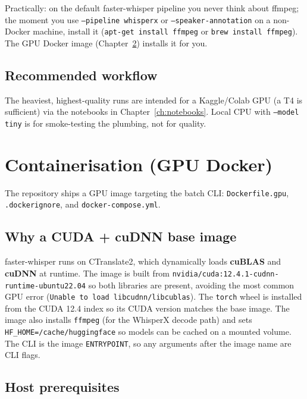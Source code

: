 \documentclass[11pt,a4paper]{report}
\newcommand{\code}[1]{\texttt{\small #1}}
\begin{document}
Practically: on the default faster-whisper pipeline you never think about ffmpeg;
the moment you use \code{--pipeline whisperx} or \code{--speaker-annotation} on a
non-Docker machine, install it (\code{apt-get install ffmpeg} or
\code{brew install ffmpeg}). The GPU Docker image (Chapter~\ref{ch:docker})
installs it for you.

\section{Recommended workflow}

The heaviest, highest-quality runs are intended for a Kaggle/Colab GPU (a T4 is
sufficient) via the notebooks in Chapter~\ref{ch:notebooks}. Local CPU with
\code{--model tiny} is for smoke-testing the plumbing, not for quality.

\chapter{Containerisation (GPU Docker)}
\label{ch:docker}

The repository ships a GPU image targeting the batch CLI:
\code{Dockerfile.gpu}, \code{.dockerignore}, and \code{docker-compose.yml}.

\section{Why a CUDA + cuDNN base image}

faster-whisper runs on CTranslate2, which dynamically loads \textbf{cuBLAS} and
\textbf{cuDNN} at runtime. The image is built from
\code{nvidia/cuda:12.4.1-cudnn-runtime-ubuntu22.04} so both libraries are present,
avoiding the most common GPU error (\code{Unable to load libcudnn/libcublas}). The
\code{torch} wheel is installed from the CUDA 12.4 index so its CUDA version
matches the base image. The image also installs \code{ffmpeg} (for the WhisperX
decode path) and sets \code{HF\_HOME=/cache/huggingface} so models can be cached on
a mounted volume. The CLI is the image \code{ENTRYPOINT}, so any arguments after
the image name are CLI flags.

\section{Host prerequisites}
\end{document}
